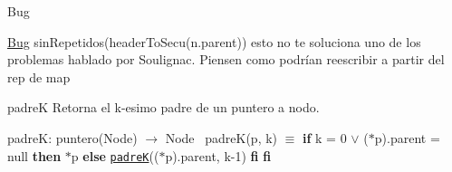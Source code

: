 \begin{DoxyRefDesc}{Bug}
\item[\hyperlink{bug__bug000001}{Bug}]sin\+Repetidos(header\+To\+Secu(n.\+parent)) esto no te soluciona uno de los problemas hablado por Soulignac. Piensen como podrían reescribir a partir del rep de map\end{DoxyRefDesc}


\begin{DoxyParagraph}{padreK}
Retorna el k-\/esimo padre de un puntero a nodo.

padreK\+: puntero(\+Node) $\to$ Node~\newline
 padre\+K(p, k) $\equiv$ {\bfseries if} k = 0 $\lor$ ($\ast$p).parent = null {\bfseries then} $\ast$p {\bfseries else} \href{axiomas.html#padreK}{\tt padreK}(($\ast$p).parent, k-\/1) {\bfseries fi} {\bfseries fi} 
\end{DoxyParagraph}
